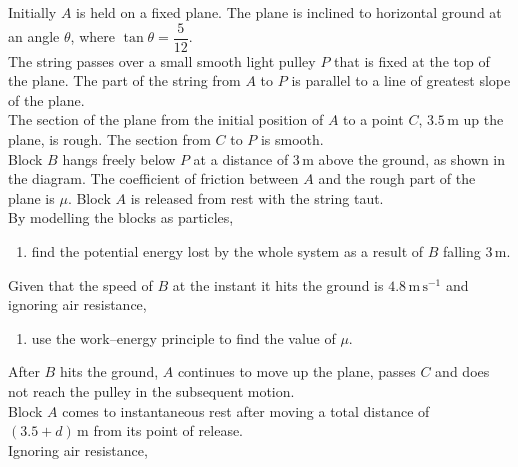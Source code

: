 \documentclass[leqno]{article}
\begin{document}
\begin{enumerate}[
  label=\textbf{\arabic*.},
  leftmargin=*,
  topsep=0pt,
  partopsep=0pt,
  parsep=0pt
]
Initially $A$ is held on a fixed plane. The plane is inclined to horizontal ground at an angle $\theta$, where $\tan\theta=\dfrac{5}{12}$. \\

The string passes over a small smooth light pulley $P$ that is fixed at the top of the plane. The part of the string from $A$ to $P$ is parallel to a line of greatest slope of the plane. \\

The section of the plane from the initial position of $A$ to a point $C$, $3.5\,\mathrm{m}$ up the plane, is rough. The section from $C$ to $P$ is smooth. \\

Block $B$ hangs freely below $P$ at a distance of $3\,\mathrm{m}$ above the ground, as shown in the diagram. The coefficient of friction between $A$ and the rough part of the plane is $\mu$. Block $A$ is released from rest with the string taut. \\

By modelling the blocks as particles, \\

\begin{enumerate}[label=\textbf{(\alph*)}]
  \item find the potential energy lost by the whole system as a result of $B$ falling $3\,\mathrm{m}$.  \\
\end{enumerate}

Given that the speed of $B$ at the instant it hits the ground is $4.8\,\mathrm{m\,s^{-1}}$ and ignoring air resistance, \\

\begin{enumerate}[label=\textbf{(\alph*)}, resume]
  \item use the work--energy principle to find the value of $\mu$.  \\
\end{enumerate}

After $B$ hits the ground, $A$ continues to move up the plane, passes $C$ and does not reach the pulley in the subsequent motion. \\

Block $A$ comes to instantaneous rest after moving a total distance of $(3.5+d)\,\mathrm{m}$ from its point of release. \\

Ignoring air resistance, \\


\end{enumerate}
\end{document}
